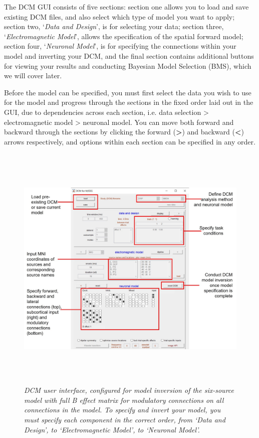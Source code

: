 The DCM GUI consists of five sections: section one allows you to load
and save existing DCM files, and also select which type of model you
want to apply; section two, `\emph{Data and Design}', is for selecting
your data; section three, `\emph{Electromagnetic Model}', allows the
specification of the spatial forward model; section four,
`\emph{Neuronal Model}', is for specifying the connections within your
model and inverting your DCM, and the final section contains additional
buttons for viewing your results and conducting Bayesian Model Selection
(BMS), which we will cover later.

Before the model can be specified, you must first select the data you
wish to use for the model and progress through the sections in the fixed
order laid out in the GUI, due to dependencies across each section, i.e.
data selection \textgreater{} electromagnetic model \textgreater{}
neuronal model. You can move both forward and backward through the
sections by clicking the forward (\textbf{\textgreater{}}) and backward
(\textbf{\textless{}}) arrows respectively, and options within each
section can be specified in any order.

\begin{figure}
\begin{center}
\includegraphics[width=6.26806in,height=4.76458in]{dcm_erp/figures/DCM_user_interface.png}
\caption{\em DCM user interface, configured for model inversion of the
six-source model with full B effect matrix for modulatory connections on
all connections in the model. To specify and invert your model, you must
specify each component in the correct order, from `\emph{Data and
Design'}, to `\emph{Electromagnetic Model'}, to `\emph{Neuronal Model'}.\label{dcm-erp:fig:1}}
\end{center}
\end{figure}

